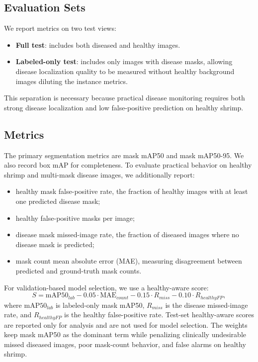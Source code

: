 \documentclass{svproc}
\begin{document}
\subsection{Evaluation Sets}

We report metrics on two test views:
\begin{itemize}
\item \textbf{Full test}: includes both diseased and healthy images.
\item \textbf{Labeled-only test}: includes only images with disease
masks, allowing disease localization quality to be measured without
healthy background images diluting the instance metrics.
\end{itemize}
This separation is necessary because practical disease monitoring
requires both strong disease localization and low false-positive
prediction on healthy shrimp.

\subsection{Metrics}

The primary segmentation metrics are mask mAP50 and mask mAP50-95. We
also record box mAP for completeness. To evaluate practical behavior on
healthy shrimp and multi-mask disease images, we additionally report:
\begin{itemize}
\item healthy mask false-positive rate, the fraction of healthy images
with at least one predicted disease mask;
\item healthy false-positive masks per image;
\item disease mask missed-image rate, the fraction of diseased images
where no disease mask is predicted;
\item mask count mean absolute error (MAE), measuring disagreement
between predicted and ground-truth mask counts.
\end{itemize}

For validation-based model selection, we use a healthy-aware score:
\begin{equation}
S = \mathrm{mAP50}_{lab}
- 0.05 \cdot \mathrm{MAE}_{count}
- 0.15 \cdot R_{miss}
- 0.10 \cdot R_{healthyFP},
\end{equation}
where $\mathrm{mAP50}_{lab}$ is labeled-only mask mAP50,
$R_{miss}$ is the disease missed-image rate, and $R_{healthyFP}$ is the
healthy false-positive rate. Test-set healthy-aware scores are reported
only for analysis and are not used for model selection. The weights keep
mask mAP50 as the dominant term while penalizing clinically undesirable
missed diseased images, poor mask-count behavior, and false alarms on
healthy shrimp.
\end{document}
